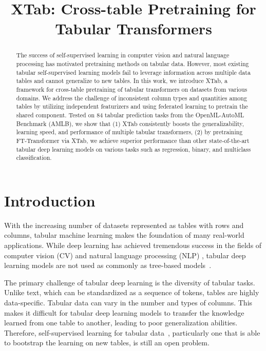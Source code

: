 \title{XTab: Cross-table Pretraining for Tabular Transformers}

\begin{abstract}
The success of self-supervised learning in computer vision and natural language processing has motivated pretraining methods on tabular data. However, most existing tabular self-supervised learning models fail to leverage information across multiple data tables and cannot generalize to new tables. In this work, we introduce XTab, a framework for cross-table pretraining of tabular transformers on datasets from various domains. We address the challenge of inconsistent column types and quantities among tables by utilizing independent featurizers and using federated learning to pretrain the shared component. Tested on 84 tabular prediction tasks from the OpenML-AutoML Benchmark (AMLB), we show that (1) XTab consistently boosts the generalizability, learning speed, and performance of multiple tabular transformers, (2) by pretraining FT-Transformer via XTab, we achieve superior performance than other state-of-the-art tabular deep learning models on various tasks such as regression, binary, and multiclass classification.
\end{abstract}

\section{Introduction} 
\label{introduction}
With the increasing number of datasets represented as tables with rows and columns, tabular machine learning makes the foundation of many real-world applications. While deep learning has achieved tremendous success in the fields of computer vision (CV) \citep{he2022masked, liu2021swin} and natural language processing (NLP) \citep{devlin2018bert, vaswani2017attention}, tabular deep learning models are not used as commonly as tree-based models~\citep{grinsztajn2022tree, gijsbers2022amlb}. 

The primary challenge of tabular deep learning is the diversity of tabular tasks. Unlike text, which can be standardized as a sequence of tokens, tables are highly data-specific. Tabular data can vary in the number and types of columns. This makes it difficult for tabular deep learning models to transfer the knowledge learned from one table to another, leading to poor generalization abilities. Therefore, self-supervised learning for tabular data~\citep{he2022masked, devlin2018bert}, particularly one that is able to bootstrap the learning on new tables, is still an open problem.

